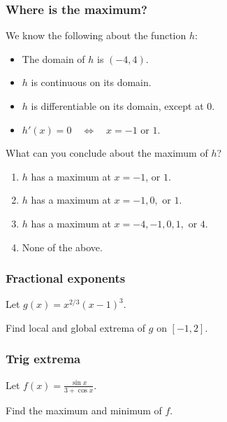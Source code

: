 \documentclass[14pt]{beamer}
\begin{document}
	\begin{frame}[t]
		\frametitle{Where is the maximum?}

		We know the following about the function $h$:
		\begin{itemize}
			\item The domain of $h$ is $\displaystyle (-4,4)$.

			\item $h$ is continuous on its domain.

			\item $h$ is differentiable on its domain, except at $0$.

			\item $h'(x) = 0 \quad \iff \quad x=-1 \mbox{ or }1$.
		\end{itemize}

		\begin{block}{What can you conclude about the maximum of $h$?}
			\pause
			\begin{enumerate}
				\item $h$ has a maximum at $x=-1$, or $1$.

				\item $h$ has a maximum at $x=-1,0,$ or $1$.

				\item $h$ has a maximum at $x=-4, -1,0, 1,$ or $4$.

				\item None of the above.
			\end{enumerate}
		\end{block}
	\end{frame}


	\begin{frame}[t]
		\frametitle{Fractional exponents}

		Let $\displaystyle  g(x) = x^{2/3} (x-1)^3. $

		\medskip
		Find local and global extrema of $g$ on $\displaystyle [-1,2]$.
	\end{frame}

	\begin{frame}[t]
		\frametitle{Trig extrema}

		Let $\displaystyle  f(x) = \frac{\sin x}{3 + \cos x}. $

		\medskip
		Find the maximum and minimum of $f$.
	\end{frame}
\end{document}
